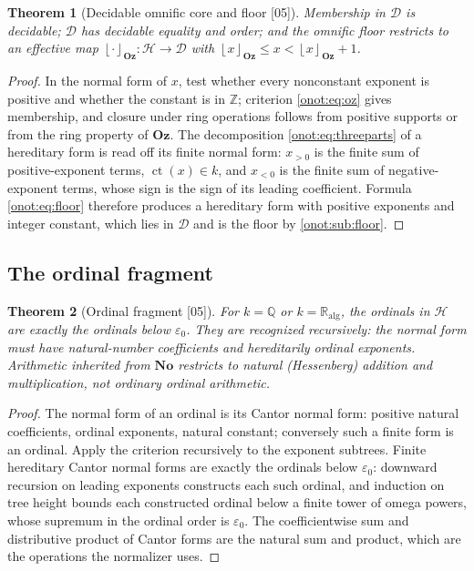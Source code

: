 \documentclass[11pt,oneside]{article}
\numberwithin{equation}{section}
\newtheorem{theorem}{Theorem}[section]
\theoremstyle{definition}
\theoremstyle{remark}
\newcommand{\No}{\mathbf{No}}
\newcommand{\Oz}{\mathbf{Oz}}
\newcommand{\Z}{\mathbb Z}
\newcommand{\Q}{\mathbb Q}
\newcommand{\R}{\mathbb R}
\newcommand{\Ralg}{\R_{\mathrm{alg}}}
\newcommand{\Hh}{\mathcal H}
\newcommand{\Dd}{\mathcal D}
\newcommand{\ct}{\operatorname{ct}}
\newcommand{\fl}[1]{\left\lfloor #1\right\rfloor_{\Oz}}
\newcommand{\src}[1]{\textup{\textsf{\small[#1]}}}
\begin{document}
\begin{theorem}[Decidable omnific core and floor \src{05}]\label{onot:sh:thm:floor}
Membership in $\Dd$ is decidable; $\Dd$ has decidable equality and order; and
the omnific floor restricts to an effective map $\fl{\cdot}:\Hh\to\Dd$ with
$\fl x\le x<\fl x+1$.
\end{theorem}
\begin{proof}
In the normal form of $x$, test whether every nonconstant exponent is positive
and whether the constant is in $\Z$; criterion \eqref{onot:eq:oz} gives
membership, and closure under ring operations follows from positive supports or
from the ring property of $\Oz$. The decomposition
\eqref{onot:eq:threeparts} of a hereditary form is read off its finite normal
form: $x_{>0}$ is the finite sum of positive-exponent terms, $\ct(x)\in k$, and
$x_{<0}$ is the finite sum of negative-exponent terms, whose sign is the sign of
its leading coefficient. Formula \eqref{onot:eq:floor} therefore produces a
hereditary form with positive exponents and integer constant, which lies in $\Dd$
and is the floor by \cref{onot:sub:floor}.
\end{proof}

\subsection{The ordinal fragment}

\begin{theorem}[Ordinal fragment \src{05}]\label{onot:sh:thm:ordinalfragment}
For $k=\Q$ or $k=\Ralg$, the ordinals in $\Hh$ are exactly the ordinals below
$\varepsilon_0$. They are recognized recursively: the normal form must have
natural-number coefficients and hereditarily ordinal exponents. Arithmetic
inherited from $\No$ restricts to natural (Hessenberg) addition and
multiplication, not ordinary ordinal arithmetic.
\end{theorem}
\begin{proof}
The normal form of an ordinal is its Cantor normal form: positive natural
coefficients, ordinal exponents, natural constant; conversely such a finite form
is an ordinal. Apply the criterion recursively to the exponent subtrees. Finite
hereditary Cantor normal forms are exactly the ordinals below $\varepsilon_0$:
downward recursion on leading exponents constructs each such ordinal, and
induction on tree height bounds each constructed ordinal below a finite tower of
omega powers, whose supremum in the ordinal order is $\varepsilon_0$. The
coefficientwise sum and distributive product of Cantor forms are the natural sum
and product, which are the operations the normalizer uses.
\end{proof}
\end{document}
